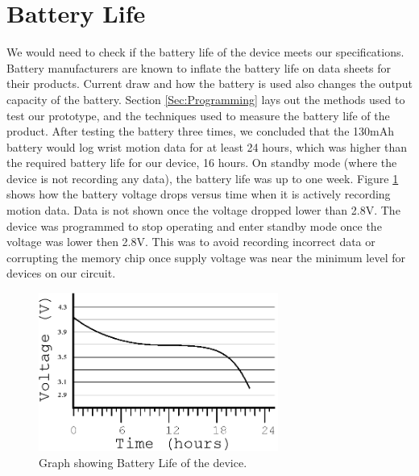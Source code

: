 \section{Battery Life}
\label{Sec:ResultsBatteryLife}
We would need to check if the battery life of the device meets our specifications.
Battery manufacturers are known to inflate the battery life on data sheets for their products.
Current draw and how the battery is used also changes the output capacity of the battery.
Section \ref{Sec:Programming} lays out the methods used to test our prototype,
and the techniques used to measure the battery life of the product.
After testing the battery three times,
we concluded that the 130mAh battery would log wrist motion data for at least 24 hours,
which was higher than the required battery life for our device,
16 hours.
On standby mode (where the device is not recording any data), the battery life was up to one week.
Figure \ref{Fig:BatteryGraph} shows how the battery voltage drops versus time when it is actively recording motion data.
Data is not shown once the voltage dropped lower than 2.8V. The device was programmed to stop operating and enter standby mode once the voltage was lower then 2.8V. This was to avoid recording incorrect data or corrupting the memory chip once supply voltage was near the minimum level for devices on our circuit.

\begin{figure}
\begin{center}
\includegraphics[width=0.7\textwidth]{images/BattLife.eps}
\caption{Graph showing Battery Life of the device.}
\label{Fig:BatteryGraph}
\end{center}
\end{figure}

